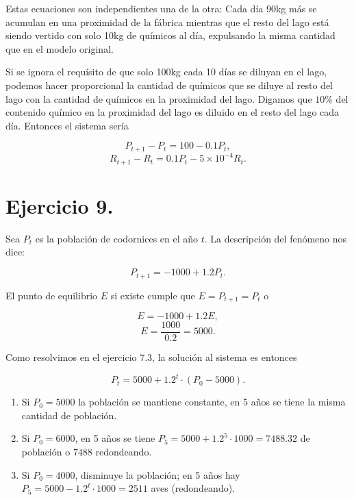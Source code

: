 \documentclass[11pt]{article}
\begin{document}
    Estas ecuaciones son independientes una de la otra: Cada día 90kg más se
acumulan en una proximidad de la fábrica mientras que el resto del lago
está siendo vertido con solo 10kg de químicos al día, expulsando la
misma cantidad que en el modelo original.

    Si se ignora el requísito de que solo 100kg cada 10 días se diluyan en
el lago, podemos hacer proporcional la cantidad de químicos que se
diluye al resto del lago con la cantidad de químicos en la proximidad
del lago. Digamos que \(10\%\) del contenido químico en la proximidad
del lago es diluido en el resto del lago cada día. Entonces el sistema
sería

\[P_{t+1}-P_t = 100-0.1P_t,\]
\[R_{t+1}-R_t = 0.1P_t -5\times 10^{-4} R_t.\]

    \hypertarget{ejercicio-9.}{%
\section*{Ejercicio 9.}\label{ejercicio-9.}}

Sea \(P_t\) es la población de codornices en el año \(t\). La
descripción del fenómeno nos dice:

\[P_{t+1} = -1000+1.2P_t.\]

El punto de equilibrio \(E\) si existe cumple que \(E=P_{t+1}=P_{t}\) o

\[E = -1000+1.2E,\] \[E = \frac{1000}{0.2} = 5000.\]

Como resolvimos en el ejercicio 7.3, la solución al sistema es entonces

\[P_t = 5000+1.2^t\cdot(P_0-5000).\]

    \begin{enumerate}
\def\labelenumi{\alph{enumi})}
\item
  Si \(P_0=5000\) la población se mantiene constante, en 5 años se tiene
  la misma cantidad de población.
\item
  Si \(P_0=6000\), en 5 años se tiene
  \(P_5= 5000+1.2^5\cdot 1000=7488.32\) de población o \(7488\)
  redondeando.
\item
  Si \(P_0=4000\), disminuye la población; en 5 años hay
  \(P_5=5000-1.2^t\cdot 1000=2511\) aves (redondeando).
\end{enumerate}


    
    
    
\end{document}
